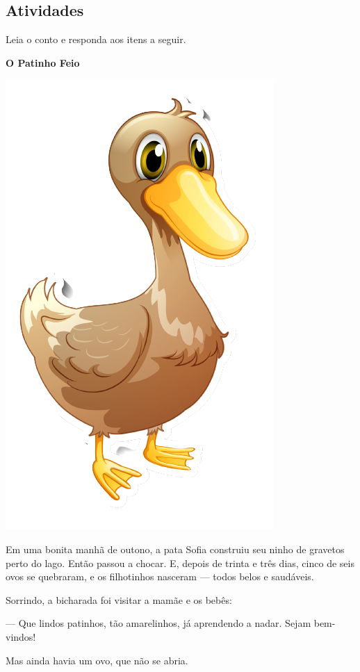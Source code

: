 \begin{conteudo}
\begin{conteudo}
\begin{conteudo}
\begin{conteudo}
\begin{conteudo}
\section*{Atividades}

Leia o conto e responda aos itens a seguir.



\begin{myquote}

\textbf{O Patinho Feio}

\begin{center}
\includegraphics[width=.3\textwidth]{media/image36a.png}
\end{center}

Em uma bonita manhã de outono, a pata Sofia construiu seu ninho de
gravetos perto do lago. Então passou a chocar. E, depois de trinta e
três dias, cinco de seis ovos se quebraram, e os filhotinhos nasceram
--- todos belos e saudáveis.

Sorrindo, a bicharada foi visitar a mamãe e os bebês:

--- Que lindos patinhos, tão amarelinhos, já aprendendo a nadar. Sejam
bem-vindos!

Mas ainda havia um ovo, que não se abria.


\end{myquote}
\end{conteudo}
\end{conteudo}
\end{conteudo}
\end{conteudo}
\end{conteudo}

